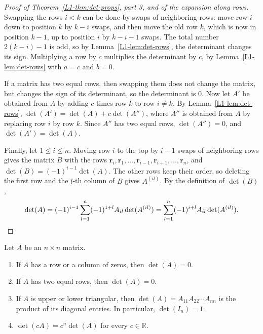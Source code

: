 \begin{proof}[Proof of Theorem~\ref{L1-thm:det-props}, part 3, and of the expansion along rows]
    Swapping the rows $i < k$ can be done by swaps of neighboring rows: move row $i$ down to position $k$ by $k - i$ swaps, and then move the old row $k$, which is now in position $k - 1$, up to position $i$ by $k - i - 1$ swaps. The total number $2(k - i) - 1$ is odd, so by Lemma~\ref{L1-lem:det-rows}, the determinant changes its sign. Multiplying a row by $c$ multiplies the determinant by $c$, by Lemma~\ref{L1-lem:det-rows} with $a = c$ and $b = 0$.

    If a matrix has two equal rows, then swapping them does not change the matrix, but changes the sign of its determinant, so the determinant is $0$. Now let $A'$ be obtained from $A$ by adding $c$ times row $k$ to row $i \neq k$. By Lemma~\ref{L1-lem:det-rows}, $\det(A') = \det(A) + c\det(A'')$, where $A''$ is obtained from $A$ by replacing row $i$ by row $k$. Since $A''$ has two equal rows, $\det(A'') = 0$, and $\det(A') = \det(A)$.

    Finally, let $1 \leq i \leq n$. Moving row $i$ to the top by $i - 1$ swaps of neighboring rows gives the matrix $B$ with the rows $\mathbf{r}_i, \mathbf{r}_1, \ldots, \mathbf{r}_{i-1}, \mathbf{r}_{i+1}, \ldots, \mathbf{r}_n$, and $\det(B) = (-1)^{i-1}\det(A)$. The other rows keep their order, so deleting the first row and the $l$-th column of $B$ gives $A^{(il)}$. By the definition of $\det(B)$,
    \[\det(A) = (-1)^{i-1}\sum_{l=1}^n (-1)^{1+l} A_{il}\det(A^{(il)}) = \sum_{l=1}^n (-1)^{i+l} A_{il}\det(A^{(il)}). \qedhere\]
\end{proof}

\begin{corollary}\label{L1-cor:det-easy}
    Let $A$ be an $n \times n$ matrix.
    \begin{enumerate}
        \item If $A$ has a row or a column of zeros, then $\det(A) = 0$.
        \item If $A$ has two equal rows, then $\det(A) = 0$.
        \item If $A$ is upper or lower triangular, then $\det(A) = A_{11} A_{22} \cdots A_{nn}$ is the product of its diagonal entries. In particular, $\det(I_n) = 1$.
        \item $\det(cA) = c^n \det(A)$ for every $c \in \mathbb{R}$.
    \end{enumerate}
\end{corollary}

